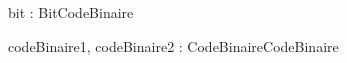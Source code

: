 \begin{algorithme}

    {bit : Bit}{CodeBinaire}

    {codeBinaire1, codeBinaire2 : CodeBinaire}{CodeBinaire}

\end{algorithme}